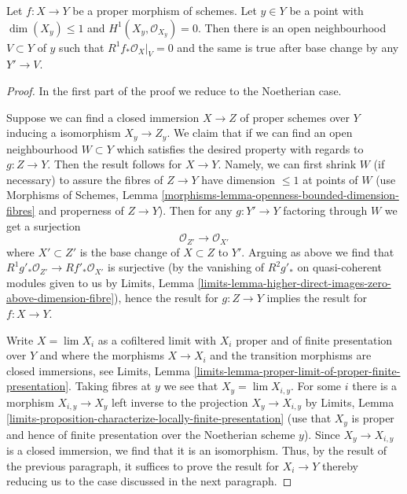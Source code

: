 \begin{lemma}
\label{lemma-h1-fibre-zero}
Let $f : X \to Y$ be a proper morphism of schemes. Let $y \in Y$
be a point with $\dim(X_y) \leq 1$ and $H^1(X_y, \mathcal{O}_{X_y}) = 0$.
Then there is an open neighbourhood $V \subset Y$ of $y$ such that
$R^1f_*\mathcal{O}_X|_V = 0$
and the same is true after base change by any $Y' \to V$.
\end{lemma}

\begin{proof}
In the first part of the proof we reduce to the Noetherian case.

\medskip\noindent
Suppose we can find a closed immersion $X \to Z$ of proper schemes over $Y$
inducing a isomorphism
$X_y \to Z_y$. We claim that if we can find an open neighbourhood
$W \subset Y$ which satisfies the desired property with regards to
$g : Z \to Y$. Then the result follows for $X \to Y$.
Namely, we can first shrink $W$ (if necessary) to assure
the fibres of $Z \to Y$ have dimension $\leq 1$ at points of $W$
(use Morphisms of Schemes, Lemma
\ref{morphisms-lemma-openness-bounded-dimension-fibres}
and properness of $Z \to Y$). Then for any $g : Y' \to Y$ factoring
through $W$ we get a surjection
$$
\mathcal{O}_{Z'} \longrightarrow \mathcal{O}_{X'}
$$
where $X' \subset Z'$ is the base change of $X \subset Z$ to $Y'$.
Arguing as above we find that
$R^1g'_*\mathcal{O}_{Z'} \to Rf'_*\mathcal{O}_{X'}$
is surjective (by the vanishing of $R^2g'_*$ on quasi-coherent modules
given to us by Limits, Lemma
\ref{limits-lemma-higher-direct-images-zero-above-dimension-fibre}),
hence the result for $g : Z \to Y$ implies the result for $f : X \to Y$.

\medskip\noindent
Write $X = \lim X_i$ as a cofiltered limit with $X_i$ proper and of finite
presentation over $Y$ and where the morphisms $X \to X_i$ and
the transition morphisms are closed immersions, see
Limits, Lemma \ref{limits-lemma-proper-limit-of-proper-finite-presentation}.
Taking fibres at $y$ we see that $X_y = \lim X_{i, y}$.
For some $i$ there is a morphism $X_{i, y} \to X_y$
left inverse to the projection $X_y \to X_{i, y}$ by
Limits, Lemma
\ref{limits-proposition-characterize-locally-finite-presentation}
(use that $X_y$ is proper and hence of finite presentation over
the Noetherian scheme $y$). Since $X_y \to X_{i, y}$ is a closed
immersion, we find that it is an isomorphism.
Thus, by the result of the previous paragraph, it suffices
to prove the result for $X_i \to Y$ thereby reducing us
to the case discussed in the next paragraph.


\end{proof}
